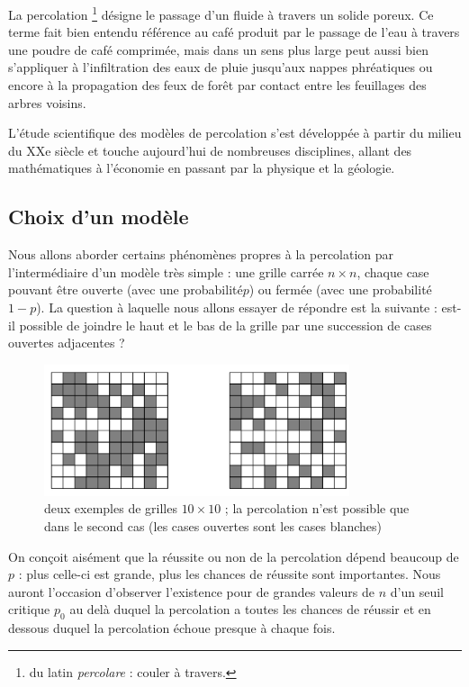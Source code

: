 
La percolation \footnote{du latin \emph{percolare} : couler à travers.} désigne le passage d'un fluide à
travers un solide poreux. Ce terme fait bien entendu référence au café
produit par le passage de l'eau à travers une poudre de café comprimée,
mais dans un sens plus large peut aussi bien s'appliquer à
l'infiltration des eaux de pluie jusqu'aux nappes phréatiques ou encore
à la propagation des feux de forêt par contact entre les feuillages des
arbres voisins.

L'étude scientifique des modèles de percolation s'est développée à
partir du milieu du XXe siècle et touche aujourd'hui de nombreuses
disciplines, allant des mathématiques à l'économie en passant par la
physique et la géologie.

\setcounter{section}{1}
\subsection{Choix d'un modèle}\label{choix-dun-moduxe8le}


Nous allons aborder certains phénomènes propres à la percolation par
l'intermédiaire d'un modèle très simple : une grille carrée $n\times n$,
chaque case pouvant être ouverte (avec une probabilité$p$) ou
fermée (avec une probabilité $1-p$). La question à laquelle nous
allons essayer de répondre est la suivante : est-il possible de joindre
le haut et le bas de la grille par une succession de cases ouvertes
adjacentes ?

\begin{figure}[!htb]
\begin{center}
\includegraphics[width=0.8\textwidth]{illustration_perco.jpg}
\caption{deux exemples de grilles $10\times10$ ; la percolation
n'est possible que dans le second cas (les cases ouvertes sont les cases
blanches) \label{fig1}}
\end{center}
\end{figure}




On conçoit aisément que la réussite ou non de la percolation dépend
beaucoup de $p$ : plus celle-ci est grande, plus les chances de
réussite sont importantes. Nous auront l'occasion d'observer l'existence
pour de grandes valeurs de $n$ d'un seuil critique $p_0$ au delà duquel la percolation a toutes les chances de réussir et en dessous duquel la percolation échoue presque à
chaque fois.

